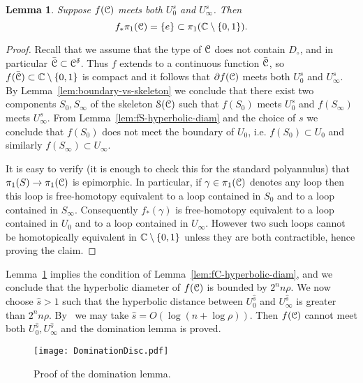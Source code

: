 \documentclass[reqno]{amsart}
\newtheorem{Lem}[Cor]{Lemma}{\bfseries}{\itshape}
\renewcommand\~[1]{\widetilde{#1}}
\def\cS{{\mathcal S}} \def\cSc{{\mathcal S \mathcal C}}
\begin{document}
\begin{Lem}\label{lem:trivial-homotopy}
  Suppose $f({\mathcal C})$ meets both $U_0^s$ and $U_\infty^s$. Then
  \begin{equation}
    f_*\pi_1({\mathcal C})=\{e\}\subset\pi_1({\mathbb C}\setminus\{0,1\}).
  \end{equation}
\end{Lem}
\begin{proof}
  Recall that we assume that the type of ${\mathcal C}$ does not contain
  $D_\circ$, and in particular $\bar{{\mathcal C}}\subset{\mathcal C}^\delta$. Thus $f$
  extends to a continuous function $\bar{{\mathcal C}}$, so
  $f(\bar{{\mathcal C}})\subset{\mathbb C}\setminus\{0,1\}$ is compact and it follows that
  $\partial f({\mathcal C})$ meets both $U_0^s$ and $U_\infty^s$. By
  Lemma~\ref{lem:boundary-vs-skeleton} we conclude that there exist
  two components $S_0,S_\infty$ of the skeleton $\cS(\cC)$ such that
  $f(S_0)$ meets $U_0^s$ and $f(S_\infty)$ meets
  $U_\infty^s$. From Lemma~\ref{lem:fS-hyperbolic-diam} and the
  choice of $s$ we conclude that $f(S_0)$ does not meet the
  boundary of $U_0$, i.e. $f(S_0)\subset U_0$ and similarly
  $f(S_\infty)\subset U_\infty$.

  It is easy to verify (it is enough to check this for the standard
  polyannulus) that $\pi_1(S)\to\pi_1({\mathcal C})$ is epimorphic. In
  particular, if $\gamma\in\pi_1({\mathcal C})$ denotes any loop then this loop
  is free-homotopy equivalent to a loop contained in $S_0$ and to a
  loop contained in $S_\infty$. Consequently $f_*(\gamma)$ is
  free-homotopy equivalent to a loop contained in $U_0$ and to a loop
  contained in $U_\infty$. However two such loops cannot be
  homotopically equivalent in ${\mathbb C}\setminus\{0,1\}$ unless they are
  both contractible, hence proving the claim.
\end{proof}

Lemma~\ref{lem:trivial-homotopy} implies the condition of
Lemma~\ref{lem:fC-hyperbolic-diam}, and we conclude that the
hyperbolic diameter of $f({\mathcal C})$ is bounded by $2^nn\rho$. We now
choose $\hat s>1$ such that the hyperbolic distance between
$U_0^{\hat s}$ and $U^{\hat s}_\infty$ is greater than
$2^nn\rho$. By~ we may take
$\hat s=O(\log(n+\log\rho))$. Then $f({\mathcal C})$ cannot meet both
$U_0^{\hat s},U^{\hat s}_\infty$ and the domination lemma is
proved.
\begin{figure}
  \centering
  \texttt{[image: DominationDisc.pdf]}
  \caption{Proof of the domination lemma.}
  \label{fig:DominationDisc}
\end{figure}
  
\end{document}
